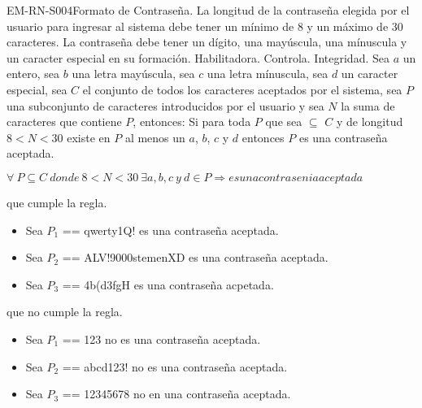 \begin{BussinesRule}{EM-RN-S004}{Formato de Contraseña.} 
	\BRitem[Descripción:] La longitud de la contraseña elegida  por el usuario para ingresar al sistema 
	debe tener un mínimo de 8 y un máximo de 30 caracteres. 
	La contraseña debe tener un dígito, una mayúscula, una mínuscula y un caracter especial en su
	formación.
	\BRitem[Tipo:] Habilitadora.
	\BRitem[Nivel:] Controla.
	\BRitem[Clase:] Integridad.
	\BRitem[Sentenia: ] Sea $a$ un entero, sea $b$ una letra mayúscula, sea $c$ una letra mínuscula,
	sea $d$ un caracter especial, sea $C$ el conjunto de todos los caracteres aceptados 
	por el sistema, sea $P$ una subconjunto de caracteres introducidos por el usuario y sea 
	$N$ la suma de  caracteres que contiene $P$, entonces: \newline
	Si para toda $P$ que sea $\subseteq$ $C$ y de longitud $8 < N < 30$ existe en $P$ al menos un $a$, $b$, 
	$c$ y $d$ entonces $P$ es una contraseña aceptada.
	\begin{center}
		$\forall \: P \subseteq C \: donde \: 8 < N < 30 \: \exists a, b, c \:y\: d \in P 
		\Rightarrow  es una contrasenia aceptada$
	\end{center}
	 que cumple la regla.
		\begin{itemize}
			\item Sea $P_{1}$ == qwerty1Q! es una contraseña aceptada. 
			\item Sea $P_{2}$ == ALV!9000stemenXD es una contraseña aceptada.
			\item Sea $P_{3}$ == 4b(d3fgH es una contraseña acpetada.
		\end{itemize}
	 que no cumple la regla.
		\begin{itemize}
			\item Sea $P_{1}$ == 123 no es una contraseña aceptada.
			\item Sea $P_{2}$ == abcd123! no es una contraseña aceptada.
			\item Sea $P_{3}$ == 12345678 no en una contraseña aceptada.
		\end{itemize}
\end{BussinesRule}


